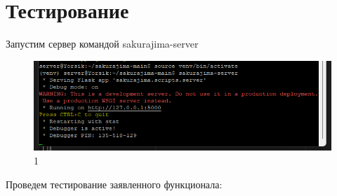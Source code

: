 \chapter{Тестирование}
\label{cha:research}

Запустим сервер командой sakurajima-server

\begin{figure}
  \centering
  \includegraphics[width=.9\textwidth]{graphics/test/dev_server_run.png}
  \caption{1}
  \label{fig:test1}
\end{figure}

Проведем тестирование заявленного функционала:

